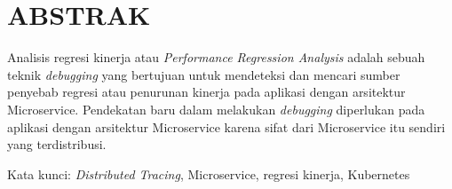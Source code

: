\clearpage
\chapter*{ABSTRAK}

Analisis regresi kinerja atau \textit{Performance Regression Analysis} adalah sebuah teknik \textit{debugging} yang bertujuan untuk mendeteksi dan mencari sumber penyebab regresi atau penurunan kinerja pada aplikasi dengan arsitektur Microservice. Pendekatan baru dalam melakukan \textit{debugging} diperlukan pada aplikasi dengan arsitektur Microservice karena sifat dari Microservice itu sendiri yang terdistribusi. 

%
%





\vspace{15mm}
Kata kunci: \textit{Distributed Tracing}, Microservice, regresi kinerja, Kubernetes
\clearpage